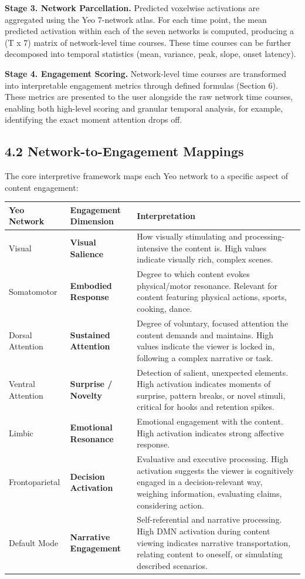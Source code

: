 \documentclass[11pt,letterpaper]{article}
\begin{document}
\textbf{Stage 3. Network Parcellation.} Predicted voxelwise activations are aggregated using the Yeo 7-network atlas. For each time point, the mean predicted activation within each of the seven networks is computed, producing a (T x 7) matrix of network-level time courses. These time courses can be further decomposed into temporal statistics (mean, variance, peak, slope, onset latency).

\textbf{Stage 4. Engagement Scoring.} Network-level time courses are transformed into interpretable engagement metrics through defined formulas (Section 6). These metrics are presented to the user alongside the raw network time courses, enabling both high-level scoring and granular temporal analysis, for example, identifying the exact moment attention drops off.

\subsection{4.2 Network-to-Engagement Mappings}

The core interpretive framework maps each Yeo network to a specific aspect of content engagement:

\begin{table}[htbp]
\centering
\small
\begin{tabular}{|p{}|p{}|p{}|}
\hline
Yeo Network & Engagement Dimension & Interpretation \\
\hline
Visual & \textbf{Visual Salience} & How visually stimulating and processing-intensive the content is. High values indicate visually rich, complex scenes. \\
Somatomotor & \textbf{Embodied Response} & Degree to which content evokes physical/motor resonance. Relevant for content featuring physical actions, sports, cooking, dance. \\
Dorsal Attention & \textbf{Sustained Attention} & Degree of voluntary, focused attention the content demands and maintains. High values indicate the viewer is locked in, following a complex narrative or task. \\
Ventral Attention & \textbf{Surprise / Novelty} & Detection of salient, unexpected elements. High activation indicates moments of surprise, pattern breaks, or novel stimuli, critical for hooks and retention spikes. \\
Limbic & \textbf{Emotional Resonance} & Emotional engagement with the content. High activation indicates strong affective response. \\
Frontoparietal & \textbf{Decision Activation} & Evaluative and executive processing. High activation suggests the viewer is cognitively engaged in a decision-relevant way, weighing information, evaluating claims, considering action. \\
Default Mode & \textbf{Narrative Engagement} & Self-referential and narrative processing. High DMN activation during content viewing indicates narrative transportation, relating content to oneself, or simulating described scenarios. \\
\hline
\end{tabular}
\end{table}
\end{document}
